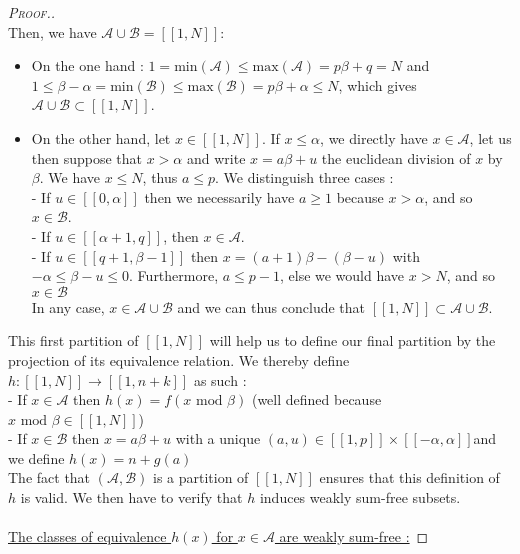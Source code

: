 \begin{proof}[\textsc{Proof.}]
\\
Then, we have \underline{\(\mathcal{A} \cup \mathcal{B} = [\![1,N]\!]\)}:
\begin{itemize}
	\item On the one hand : \(1 = \text{min}(\mathcal{A}) \leqslant \text{max}(\mathcal{A}) = p\beta + q = N\) and
\(1 \leqslant \beta - \alpha = \text{min}(\mathcal{B}) \leqslant \text{max}(\mathcal{B}) = p\beta + \alpha \leqslant
N\),
	which gives \(\mathcal{A} \cup \mathcal{B} \subset [\![1,N]\!]\).
\item On the other hand, let \(x \in [\![1,N]\!]\). If \(x \leqslant \alpha\), we directly have \(x \in \mathcal{A}\),
let us then suppose that \(x > \alpha\) and write \(x = a\beta + u\)
the euclidean division of \(x\) by \(\beta\). We have \(x \leqslant N\), thus \(a \leqslant p\). We distinguish three
cases : \\
- If \(u \in [\![0,\alpha]\!]\) then we necessarily have \(a \geqslant 1\) because \(x > \alpha\), and so \(x \in
\mathcal{B}\).\\
	- If \(u \in [\![\alpha + 1,q]\!]\), then \(x \in \mathcal{A}\). \\
- If \(u \in [\![q + 1,\beta - 1]\!]\) then \(x = (a+1)\beta - (\beta - u)\) with \(-\alpha \leqslant \beta - u
\leqslant 0\).
	Furthermore, \(a \leqslant p - 1\), else we would have \(x > N\), and so \(x \in \mathcal{B}\) \\
In any case, \(x \in \mathcal{A} \cup \mathcal{B}\) and we can thus conclude that \([\![1,N]\!] \subset \mathcal{A}
\cup\mathcal{B}\).
\end{itemize}
This first partition of \([\![1,N]\!]\) will help us to define our final partition by the projection of its equivalence
relation.
We thereby define \(h : [\![1,N]\!] \longrightarrow [\![1,n+k]\!]\) as such :\\
- If \(x \in \mathcal{A}\) then \(h(x) = f(x \text{ mod } \beta)\) (well defined because \(x \text{ mod } \beta \in
[\![1,N]\!]\))\\
- If \(x \in \mathcal{B}\) then \(x = a\beta + u\) with a unique \((a,u) \in [\![1,p]\!] \times
[\![-\alpha,\alpha]\!]\)and we define \(h(x) = n + g(a)\)\\
The fact that \((\mathcal{A}, \mathcal{B})\) is a partition of \([\![1,N]\!]\) ensures that this definition of \(h\) is
valid. We then have to verify that \(h\) induces weakly sum-free subsets.\\
\\
\underline{The classes of equivalence \(h(x)\) for \(x \in \mathcal{A}\) are weakly sum-free :}

\end{proof}

